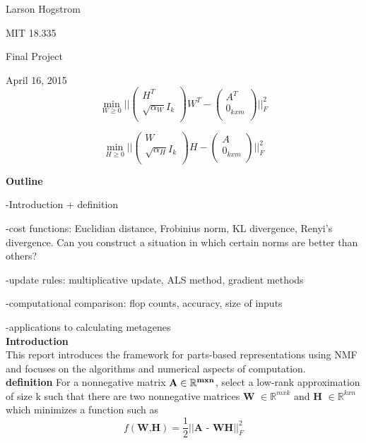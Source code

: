 \documentclass[12pt]{article}
\begin{document}
Larson Hogstrom 

MIT 18.335

Final Project

April 16, 2015 \\


\begin{equation}
    \min_{W \ge 0} || \left( \begin{array}{c} H^T   \\  \sqrt{\alpha_W}I_k \\ \end{array} \right) W^T- \left( \begin{array}{c} A^T   \\  0_{kxm} \\ \end{array} \right) ||^{2}_{F} 
\end{equation}

\begin{equation}
    \min_{H \ge 0} || \left( \begin{array}{c} W   \\  \sqrt{\alpha_H}I_k \\ \end{array} \right) H- \left( \begin{array}{c} A   \\  0_{kxm} \\ \end{array} \right) ||^{2}_{F} 
\end{equation}


\textbf{Outline}

-Introduction + definition

-cost functions: Euclidian distance, Frobinius norm, KL divergence, Renyi's divergence. Can you construct a situation in which certain norms are better than others?

-update rules: multiplicative update, ALS method, gradient methods

-computational comparison: flop counts, accuracy, size of inputs

-applications to calculating metagenes \\

\textbf{Introduction} \\
This report introduces the framework for parts-based representations using NMF and focuses on the algorithms and numerical aspects of computation. \\

\textbf{definition} For a nonnegative matrix $\bf{A} \in \mathbb{R}^{m x n}$, select a low-rank approximation of size k such that there are two nonnegative matrices \textbf{W} $ \in \mathbb{R}^{m x k}$ and \textbf{H} $ \in \mathbb{R}^{k x n}$ which minimizes a function such as 
$$ f( \textbf{W,H}) = \frac{1}{2} || \textbf{A - WH} || ^{2}_{F}$$
\end{document}
